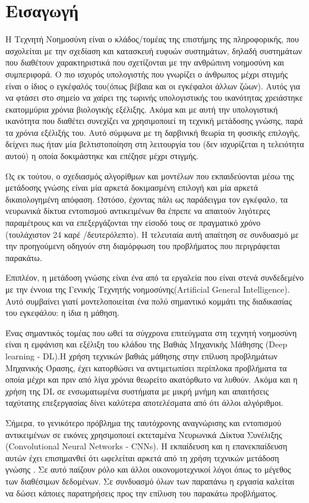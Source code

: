 \chapter{Εισαγωγή}
Η Τεχνητή Νοημοσύνη είναι ο κλάδος/τομέας της επιστήμης της πληροφορικής, που ασχολείται με την σχεδίαση και κατασκευή ευφυών συστημάτων, δηλαδή συστημάτων που διαθέτουν χαρακτηριστικά που σχετίζονται με την ανθρώπινη νοημοσύνη και συμπεριφορά. Ο πιο ισχυρός υπολογιστής που γνωρίζει ο άνθρωπος μέχρι στιγμής είναι ο ίδιος ο εγκέφαλός του(όπως βέβαια και οι εγκέφαλοι άλλων ζώων). Αυτός για να φτάσει στο σημείο να χαίρει της τωρινής υπολογιστικής του ικανότητας χρειάστηκε εκατομμύρια χρόνια βιολογικής εξέλιξης. Ακόμα και με αυτή την υπολογιστική ικανότητα που διαθέτει συνεχίζει να χρησιμοποιεί τη τεχνική μετάδοσης γνώσης, παρά τα χρόνια εξέλιξής του. Αυτό σύμφωνα με τη δαρβινική θεωρία \cite{74} τη φυσικής επιλογής, δείχνει πως ήταν μία βελτιστοποίηση στη λειτουργία του (δεν ισχυρίζεται η τελειότητα αυτού) η οποία δοκιμάστηκε και επέζησε μέχρι στιγμής.  

Ως εκ τούτου, ο σχεδιασμός αλγορίθμων και μοντέλων που εκπαιδεύονται μέσω της μετάδοσης γνώσης είναι μία αρκετά δοκιμασμένη επιλογή και μία αρκετά δικαιολογημένη απόφαση. Ωστόσο, έχοντας πάλι ως παράδειγμα τον εγκέφαλο, τα νευρωνικά δίκτυα εντοπισμού αντικειμένων θα έπρεπε να απαιτούν λιγότερες παραμέτρους και να επεξεργάζονται την είσοδό τους σε πραγματικό χρόνο (τουλάχιστον 24 καρέ /δευτερόλεπτο). Η τελευταία αυτή απαίτηση σε συνδυασμό με την προηγούμενη οδηγούν στη διαμόρφωση του προβλήματος που περιγράφεται παρακάτω.

Επιπλέον, η μετάδοση γνώσης είναι ένα από τα εργαλεία που είναι στενά συνδεδεμένο με την έννοια της Γενικής Τεχνητής νοημοσύνης(Artificial General Intelligence). Αυτό συμβαίνει γιατί μοντελοποιείται ένα πολύ σημαντικό κομμάτι της διαδικασίας του εγκεφάλου: η ίδια η μάθηση.

Ένας σημαντικός τομέας που ωθεί τα σύγχρονα επιτεύγματα στη τεχνητή νοημοσύνη είναι η εμφάνιση και εξέλιξη του κλάδου της Βαθιάς Μηχανικής Μάθησης (Deep learning - DL).Η χρήση τεχνικών βαθιάς μάθησης στην επίλυση προβλημάτων Μηχανικής Όρασης, έχει κατορθώσει να αντιμετωπίσει περίπλοκα προβλήματα τα οποία μέχρι και πριν από λίγα χρόνια θεωρείτο ακατόρθωτο να λυθούν. Ακόμα και η χρήση της DL σε ενσωματωμένα συστήματα με μικρή μνήμη και απαιτήσεις ταχύτατης επεξεργασίας δίνει καλύτερα αποτελέσματα από ότι άλλοι αλγόριθμοι.

Σήμερα, το γενικότερο πρόβλημα της ταυτόχρονης αναγνώρισης και εντοπισμού αντικειμένων σε εικόνες χρησιμοποιεί εκτεταμένα Νευρωνικά Δίκτυα Συνέλιξης (Convolutional Neural Networks - CNNs). Η εκπαίδευση και η επανεκπαίδευση αυτών έχει επισημανθεί ότι ωφελείται αρκετά από τη χρήση τεχνικών μετάδοση γνώσης \cite{55}. Σε αυτό παίζουν ρόλο και άλλοι οικονομοτεχνικοί λόγοι όπως το μέγεθος των διαθέσιμων δεδομένων. Σε συνδυασμό όλων των παραπάνω η εργασία καλείται να δώσει κάποιες παρατηρήσεις προς την επίλυση του παρακάτω προβλήματος.

